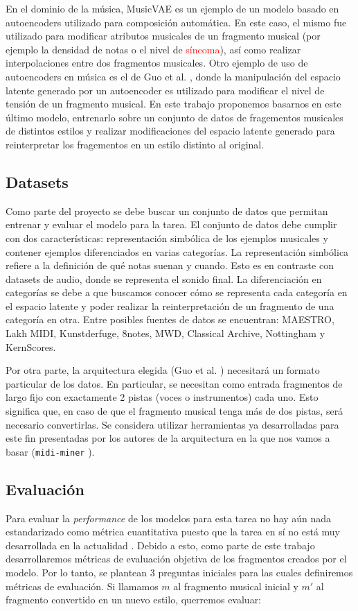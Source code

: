 \documentclass[10pt]{article}
\begin{document}
En el dominio de la música, MusicVAE \cite{roberts2019musicvae} es un ejemplo
de un modelo basado en autoencoders utilizado para composición automática. En
este caso, el mismo fue utilizado para modificar atributos musicales de un
fragmento musical (por ejemplo la densidad de notas o el nivel de 
\textcolor{red}{síncoma}), así como realizar interpolaciones entre dos fragmentos 
musicales. Otro ejemplo de uso de autoencoders en música es el de Guo et al. 
\cite{guo2020variational}, donde la manipulación del espacio latente generado por un autoencoder es utilizado para modificar el nivel de tensión de un fragmento musical. 
En este trabajo proponemos basarnos en este último modelo, entrenarlo sobre un 
conjunto de datos de fragementos musicales de distintos estilos y realizar
modificaciones del espacio latente generado para reinterpretar los fragementos
en un estilo distinto al original.

\subsection*{Datasets}
Como parte del proyecto se debe buscar un conjunto de datos que permitan
entrenar y evaluar el modelo para la tarea. El conjunto de datos debe cumplir
con dos características: representación simbólica de los ejemplos musicales y
contener ejemplos diferenciados en varias categorías. La representación
simbólica refiere a la definición de qué notas suenan y cuando. Esto es en
contraste con datasets de audio, donde se representa el sonido final.
La diferenciación en categorías se debe a que buscamos conocer cómo se
representa cada categoría en el espacio latente y poder realizar la
reinterpretación de un fragmento de una categoría en otra.
Entre posibles fuentes de datos se encuentran: MAESTRO, Lakh MIDI,
Kunstderfuge, 8notes, MWD, Classical Archive, Nottingham y KernScores.

Por otra parte, la arquitectura elegida (Guo et al. \cite{guo2020variational})
necesitará un formato particular de los datos. En particular, se necesitan como
entrada fragmentos de largo fijo con exactamente 2 pistas (voces o
instrumentos) cada uno. Esto significa que, en caso de que el fragmento musical
tenga más de dos pistas, será necesario convertirlas. Se considera utilizar  
herramientas ya desarrolladas para este fin presentadas por los autores de la
arquitectura en la que nos vamos a basar (\texttt{midi-miner}
\cite{Guo-reduccion}).

\subsection*{Evaluación}
Para evaluar la \textit{performance} de los modelos para esta tarea no hay aún
nada estandarizado como métrica cuantitativa puesto que la tarea en sí no está
muy desarrollada en la actualidad \cite{briot2020deep}. 
Debido a esto, como parte de este trabajo desarrollaremos métricas de
evaluación objetiva de los fragmentos creados por el modelo.  Por lo tanto, se
plantean 3 preguntas iniciales para las cuales definiremos métricas de
evaluación. Si llamamos $m$ al fragmento musical inicial y $m'$ al fragmento
convertido en un nuevo estilo, querremos evaluar: 
\end{document}
